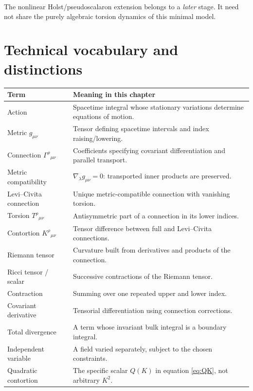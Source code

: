 \documentclass[11pt,a4paper]{article}
\begin{document}
The nonlinear Holst/pseudoscalaron extension belongs to a \emph{later} stage. It need not share the purely algebraic torsion dynamics of this minimal model.

\section{Technical vocabulary and distinctions}
\small
\renewcommand{\arraystretch}{1.25}
\begin{tabular}{@{}p{.25\linewidth}p{.68\linewidth}@{}}\toprule
\textbf{Term} & \textbf{Meaning in this chapter}\\\midrule
Action & Spacetime integral whose stationary variations determine equations of motion.\\
Metric $g_{\mu\nu}$ & Tensor defining spacetime intervals and index raising/lowering.\\
Connection $\Gamma^\rho{}_{\mu\nu}$ & Coefficients specifying covariant differentiation and parallel transport.\\
Metric compatibility & $\nabla_\lambda g_{\mu\nu}=0$: transported inner products are preserved.\\
Levi--Civita connection & Unique metric-compatible connection with vanishing torsion.\\
Torsion $T^\rho{}_{\mu\nu}$ & Antisymmetric part of a connection in its lower indices.\\
Contortion $K^\rho{}_{\mu\nu}$ & Tensor difference between full and Levi--Civita connections.\\
Riemann tensor & Curvature built from derivatives and products of the connection.\\
Ricci tensor / scalar & Successive contractions of the Riemann tensor.\\
Contraction & Summing over one repeated upper and lower index.\\
Covariant derivative & Tensorial differentiation using connection corrections.\\
Total divergence & A term whose invariant bulk integral is a boundary integral.\\
Independent variable & A field varied separately, subject to the chosen constraints.\\
Quadratic contortion & The specific scalar $Q(K)$ in equation \eqref{eq:QK}, not arbitrary $K^2$.\\\bottomrule
\end{tabular}
\normalsize
\end{document}
